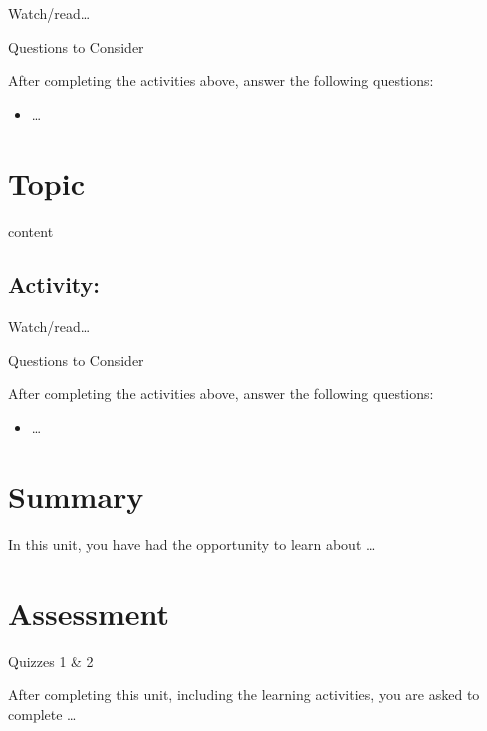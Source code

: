 \documentclass[
]{book}
\providecommand{\tightlist}{%
  \setlength{\itemsep}{0pt}\setlength{\parskip}{0pt}}
\theoremstyle{definition}
\theoremstyle{definition}
\theoremstyle{definition}
\theoremstyle{definition}
\theoremstyle{remark}
\begin{document}
\begin{reflect}
Watch/read\ldots{}

{Questions to Consider}

After completing the activities above, answer the following questions:

\begin{itemize}
\tightlist
\item
  \ldots{}
\end{itemize}
\end{reflect}

\hypertarget{topic-2}{%
\section{Topic}\label{topic-2}}

content

\hypertarget{activity-4}{%
\subsection*{Activity:}\label{activity-4}}

\begin{reflect}
Watch/read\ldots{}

{Questions to Consider}

After completing the activities above, answer the following questions:

\begin{itemize}
\tightlist
\item
  \ldots{}
\end{itemize}
\end{reflect}

\hypertarget{summary-1}{%
\section*{Summary}\label{summary-1}}

In this unit, you have had the opportunity to learn about \ldots{}

\hypertarget{assessment-1}{%
\section*{Assessment}\label{assessment-1}}

\begin{assessment}
{Quizzes 1 \& 2}

After completing this unit, including the learning activities, you are asked to complete \ldots{}
\end{assessment}
\end{document}
